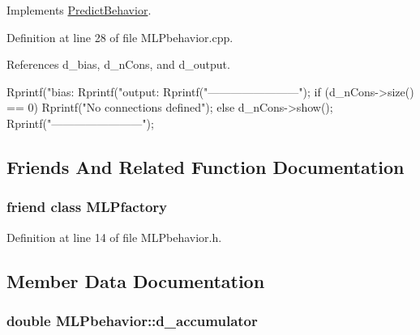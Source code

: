 Implements \hyperlink{class_predict_behavior_a9ef84360f73784248d994fa4707c1dde}{PredictBehavior}.



Definition at line 28 of file MLPbehavior.cpp.



References d\_\-bias, d\_\-nCons, and d\_\-output.


\begin{DoxyCode}
{
  Rprintf("\n bias: %
  Rprintf("\n output: %
  Rprintf("\n------------------------\n");
 if (d_nCons->size() == 0)
   {
     Rprintf("\n No connections defined");
   }
 else
   {
     d_nCons->show();
   }
 Rprintf("\n------------------------\n");
}
\end{DoxyCode}


\subsection{Friends And Related Function Documentation}
\hypertarget{class_m_l_pbehavior_a1aa48940238b9487734e590ffab33a1b}{
\subsubsection[{MLPfactory}]{\setlength{\rightskip}{0pt plus 5cm}friend class {\bf MLPfactory}}}
\label{class_m_l_pbehavior_a1aa48940238b9487734e590ffab33a1b}


Definition at line 14 of file MLPbehavior.h.



\subsection{Member Data Documentation}
\hypertarget{class_m_l_pbehavior_a5e3dcaba201554283d27d58c6aa3ea82}{
\subsubsection[{d\_\-accumulator}]{\setlength{\rightskip}{0pt plus 5cm}double {\bf MLPbehavior::d\_\-accumulator}}}
\label{class_m_l_pbehavior_a5e3dcaba201554283d27d58c6aa3ea82}


